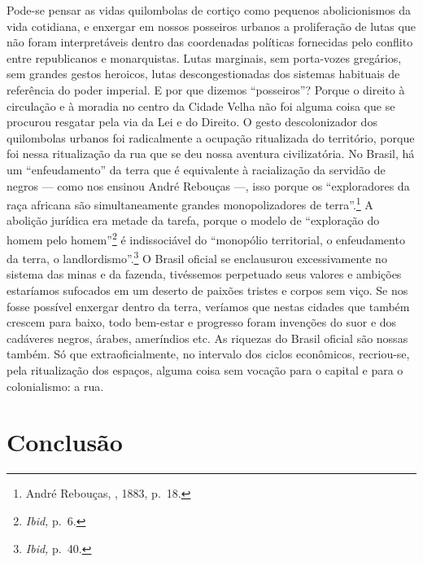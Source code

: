 Pode-se pensar as vidas quilombolas de cortiço como pequenos
abolicionismos da vida cotidiana, e enxergar em nossos posseiros urbanos
a proliferação de lutas que não foram interpretáveis dentro das
coordenadas políticas fornecidas pelo conflito entre republicanos e
monarquistas. Lutas marginais, sem porta-vozes gregários, sem grandes
gestos heroicos, lutas descongestionadas dos sistemas habituais de
referência do poder imperial. E por que dizemos ``posseiros''? Porque o
direito à circulação e à moradia no centro da Cidade Velha não foi
alguma coisa que se procurou resgatar pela via da Lei e do Direito. O
gesto descolonizador dos quilombolas urbanos foi radicalmente a ocupação
ritualizada do território, porque foi nessa ritualização da rua que se
deu nossa aventura civilizatória. No Brasil, há um ``enfeudamento'' da
terra que é equivalente à racialização da servidão de negros --- como nos
ensinou André Rebouças ---, isso porque os ``exploradores da raça
africana são simultaneamente grandes monopolizadores de
terra''.\footnote{André Rebouças, , 1883, p.~18.} A abolição jurídica
era metade da tarefa, porque o modelo de ``exploração do homem pelo
homem''\footnote{\textit{Ibid,} p.~6.} é indissociável do ``monopólio
territorial, o enfeudamento da terra, o landlordismo''.\footnote{\textit{Ibid,}
  p.~40.} O Brasil oficial se enclausurou excessivamente no sistema das
minas e da fazenda, tivéssemos perpetuado seus valores e ambições
estaríamos sufocados em um deserto de paixões tristes e corpos sem viço.
Se nos fosse possível enxergar dentro da terra, veríamos que nestas
cidades que também crescem para baixo, todo bem-estar e progresso foram
invenções do suor e dos cadáveres negros, árabes, ameríndios etc. As
riquezas do Brasil oficial são nossas também. Só que extraoficialmente,
no intervalo dos ciclos econômicos, recriou-se, pela ritualização dos
espaços, alguma coisa sem vocação para o capital e para o colonialismo:
a rua.

\section*{Conclusão}\label{conclusuxe3o}

